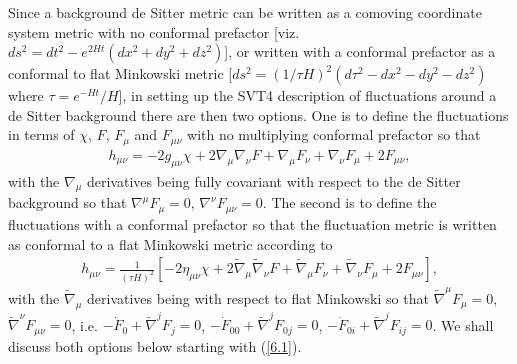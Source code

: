 \documentclass[aps,onecolumn,10pt]{revtex4}
\numberwithin{equation}{section}
\numberwithin{equation}{section}
\begin{document}
Since a background de Sitter metric can be written as a comoving coordinate system metric with no conformal prefactor [viz. $ds^2=dt^2-e^{2Ht}(dx^2+dy^2+dz^2)$],  or written with a conformal prefactor as  a conformal to flat Minkowski metric [$ds^2=(1/\tau H)^2(d\tau^2-dx^2-dy^2-dz^2)$ where $\tau=e^{-Ht}/H$],  in setting up the SVT4 description of fluctuations around a de Sitter background there are then two options. One is to define the fluctuations in terms of $\chi$, $F$, $F_{\mu}$ and $F_{\mu\nu}$ with no multiplying conformal prefactor so that
%
\begin{eqnarray}
h_{\mu\nu}=-2g_{\mu\nu}\chi+2\nabla_{\mu}\nabla_{\nu}F
+ \nabla_{\mu}F_{\nu}+\nabla_{\nu}F_{\mu}+2F_{\mu\nu},
\label{6.1}
\end{eqnarray}
%
with the $\nabla_{\mu}$ derivatives being fully covariant with respect to the de Sitter background so that $\nabla^{\mu}F_{\mu}=0$, $\nabla^{\nu}F_{\mu\nu}=0$. The second is to define the fluctuations with a conformal prefactor so that the fluctuation metric is written as conformal to a flat Minkowski metric according to
%
\begin{eqnarray}
h_{\mu\nu}=\frac{1}{(\tau H)^2}[-2\eta_{\mu\nu}\chi+2\tilde{\nabla}_{\mu}\tilde{\nabla}_{\nu}F
+ \tilde{\nabla}_{\mu}F_{\nu}+\tilde{\nabla}_{\nu}F_{\mu}+2F_{\mu\nu}],
\label{6.2}
\end{eqnarray}
%
with the $\tilde{\nabla}_{\mu}$ derivatives being with respect to flat Minkowski so that $\tilde{\nabla}^{\mu}F_{\mu}=0$, $\tilde{\nabla}^{\nu}F_{\mu\nu}=0$, i.e. $-\dot{F}_0+\tilde{\nabla}^jF_j=0$, $-\dot{F}_{00}+\tilde{\nabla}^jF_{0j}=0$, $-\dot{F}_{0i}+\tilde{\nabla}^jF_{ij}=0$. We shall discuss both options below starting with (\ref{6.1}). 
\end{document}
